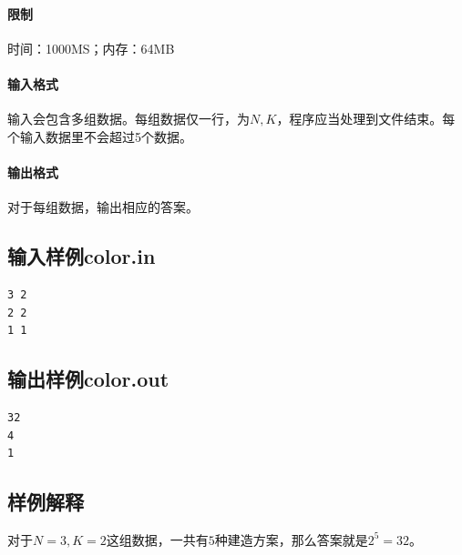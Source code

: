 \documentclass{ctexrep}
\begin{document}
\paragraph{限制} 时间：1000MS；内存：64MB

\paragraph{输入格式}
输入会包含多组数据。每组数据仅一行，为$N,K$，程序应当处理到文件结束。每个输入数据里不会超过5个数据。

\paragraph{输出格式}
对于每组数据，输出相应的答案。

\subsection*{输入样例color.in}
\begin{verbatim}
3 2
2 2
1 1
\end{verbatim}

\subsection*{输出样例color.out}
\begin{verbatim}
32
4
1
\end{verbatim}

\subsection*{样例解释}
对于$N=3,K=2$这组数据，一共有$5$种建造方案，那么答案就是$2^5=32$。
\end{document}
